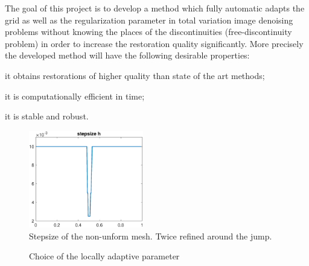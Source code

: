 \documentclass[enabledeprecatedfontcommands,cleardoublepage=empty,headsepline,twoside,11pt,DIV=15,BCOR=12mm,final]{scrartcl}
\begin{document}
 The goal of this project is to develop a method which fully automatic adapts the grid as well as the regularization parameter in total variation image denoising problems without knowing the places of the discontinuities (free-discontinuity problem) in order to increase the restoration quality significantly. More precisely the developed method will have the following desirable properties: 
\begin{inparaenum}[(i)]
\item it obtains restorations of higher quality than state of the art methods;
\item it is computationally efficient in time;
\item it is stable and robust.
\end{inparaenum}
\begin{figure}
\begin{center}
\includegraphics[width=5cm]{stepsize}
\caption{Stepsize of the non-unform mesh. Twice refined around the jump.}\label{fig:stepsize}
\end{center}
\end{figure}
\begin{figure}
\begin{center}
\hspace{0.2cm}
\caption{Choice of the locally adaptive parameter}\label{fig:lamdba}
\end{center}
\end{figure}
\end{document}
